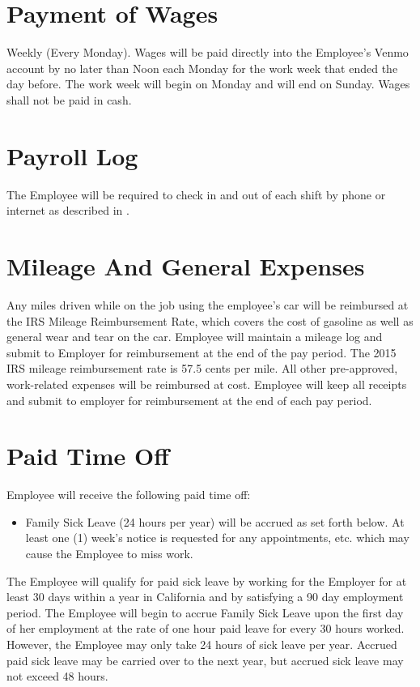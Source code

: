 \documentclass[]{article}
\begin{document}
\section{Payment of Wages}

Weekly (Every Monday). Wages will be paid directly into the Employee's Venmo account by no later than Noon each Monday for the work week that ended the day before. The work week will begin on Monday and will end on Sunday. Wages shall not be paid in cash.

\section{Payroll Log}

The Employee will be required to check in and out of each shift by phone or internet as described in .

\section{Mileage And General Expenses}

Any miles driven while on the job using the employee's car will be reimbursed at the IRS Mileage Reimbursement Rate, which covers the cost of gasoline as well as general wear and tear on the car. Employee will maintain a mileage log and submit to Employer for reimbursement at the end of the pay period. The 2015 IRS mileage reimbursement rate is 57.5 cents per mile.  All other pre-approved, work-related expenses will be reimbursed at cost. Employee will keep all receipts and submit to employer for reimbursement at the end of each pay period.

\section{Paid Time Off}

Employee will receive the following paid time off:

\begin{itemize}
\item
  Family Sick Leave (24 hours per year) will be accrued as set forth below. At least one (1) week's notice is requested for any appointments, etc. which may cause the Employee to miss work.
\end{itemize}

The Employee will qualify for paid sick leave by working for the Employer for at least 30 days within a year in California and by satisfying a 90 day employment period. The Employee will begin to accrue Family Sick Leave upon the first day of her employment at the rate of one hour paid leave for every 30 hours worked. However, the Employee may only take 24 hours of sick leave per year. Accrued paid sick leave may be carried over to the next year, but accrued sick leave may not exceed 48 hours.
\end{document}
